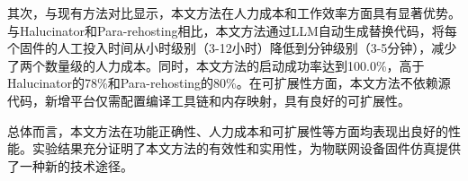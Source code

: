 其次，与现有方法对比显示，本文方法在人力成本和工作效率方面具有显著优势。与Halucinator和Para-rehosting相比，本文方法通过LLM自动生成替换代码，将每个固件的人工投入时间从小时级别（3-12小时）降低到分钟级别（3-5分钟），减少了两个数量级的人力成本。同时，本文方法的启动成功率达到100.0\%，高于Halucinator的78\%和Para-rehosting的80\%。在可扩展性方面，本文方法不依赖源代码，新增平台仅需配置编译工具链和内存映射，具有良好的可扩展性。

总体而言，本文方法在功能正确性、人力成本和可扩展性等方面均表现出良好的性能。实验结果充分证明了本文方法的有效性和实用性，为物联网设备固件仿真提供了一种新的技术途径。
